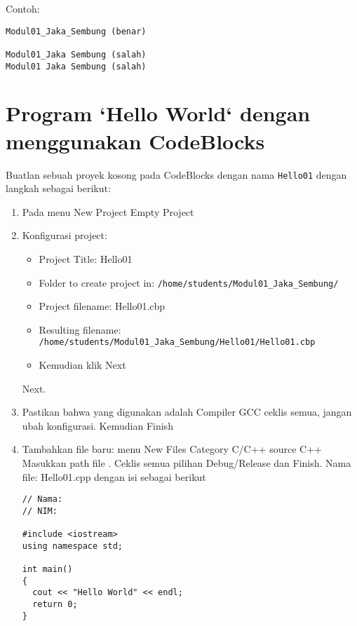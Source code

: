 \documentclass[a4paper,11pt]{extarticle}
\begin{document}
Contoh:
\begin{verbatim}
Modul01_Jaka_Sembung (benar)

Modul01_Jaka Sembung (salah)
Modul01 Jaka Sembung (salah)
\end{verbatim}

\section{Program `Hello World` dengan menggunakan CodeBlocks}

Buatlan sebuah proyek kosong pada CodeBlocks dengan nama \texttt{Hello01}
dengan langkah sebagai berikut:
\begin{enumerate}
\item Pada menu \textsf{New} \textrightarrow \textsf{Project}
      \textrightarrow \textsf{Empty Project}
%
\item Konfigurasi project:
  \begin{itemize}
  \item \textsf{Project Title}: Hello01
  \item \textsf{Folder to create project in}: \texttt{/home/students/Modul01\_Jaka\_Sembung/}
  \item \textsf{Project filename}: Hello01.cbp
  \item \textsf{Resulting filename}: \\
  \texttt{/home/students/Modul01\_Jaka\_Sembung/Hello01/Hello01.cbp}
  \item Kemudian klik \textsf{Next}
  \end{itemize}
  \textsf{Next}.
%
\item Pastikan bahwa yang digunakan adalah \textsf{Compiler GCC}
ceklis semua, jangan ubah konfigurasi. Kemudian \textsf{Finish}
%
\item Tambahkan file baru: menu 
      \textsf{New} \textrightarrow \textsf{Files} \textrightarrow
      \textsf{Category C/C++ source}
      \textrightarrow \textsf{C++} \textrightarrow
      Masukkan path file \textrightarrow
      .
      Ceklis semua pilihan \textsf{Debug/Release} dan \textsf{Finish}.
      Nama file: \textsf{Hello01.cpp} dengan isi sebagai berikut
%
\begin{verbatim}
// Nama:
// NIM:

#include <iostream>
using namespace std;

int main()
{
  cout << "Hello World" << endl;
  return 0;
}
\end{verbatim}
%
\end{enumerate}
\end{document}

